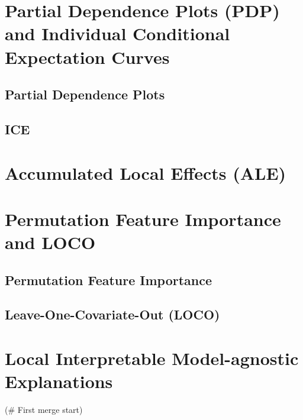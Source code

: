 \documentclass[]{krantz}
\begin{document}
\section{Partial Dependence Plots (PDP) and Individual Conditional
Expectation
Curves}\label{partial-dependence-plots-pdp-and-individual-conditional-expectation-curves}

\subsection{Partial Dependence Plots}\label{partial-dependence-plots}

\subsection{ICE}\label{ice}

\section{Accumulated Local Effects
(ALE)}\label{accumulated-local-effects-ale}

\section{Permutation Feature Importance and
LOCO}\label{permutation-feature-importance-and-loco}

\subsection{Permutation Feature
Importance}\label{permutation-feature-importance}

\subsection{Leave-One-Covariate-Out
(LOCO)}\label{leave-one-covariate-out-loco}

\section{Local Interpretable Model-agnostic
Explanations}\label{local-interpretable-model-agnostic-explanations}

(\# First merge start)
\end{document}
